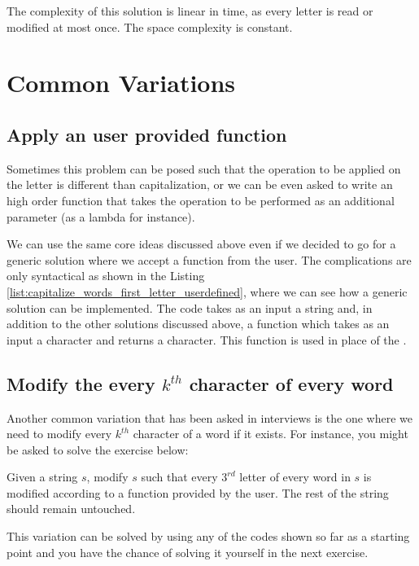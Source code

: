 The complexity of this solution is linear in time, as every letter is read or modified at most once. The space complexity is constant.



\section{Common Variations}
\label{capitalize_words_first_letter:sec:variation}

\subsection{Apply an user provided function}
Sometimes this problem can be posed such that the operation to be applied on the letter is different than capitalization, or we can be even asked to write an high order function that takes the operation to be performed as an additional parameter (as a lambda for instance).

We can use the same core ideas discussed above even if we decided to go for a generic solution where we accept a function from the user. The complications are only syntactical as shown in the Listing \ref{list:capitalize_words_first_letter_userdefined}, where we can see how a generic solution can be implemented.
The code takes as an input a string and, in addition to the other solutions discussed above, a function  which takes as an input a character and returns a character. This function is used in place of the .



\subsection{Modify the every $k^{th}$ character of every word}
Another common variation that has been asked in interviews is the one where we need to modify every $k^{th}$ character of a word if it exists. For instance, you might be asked to solve the exercise below:
\begin{exercise}
Given a string $s$, modify $s$ such that every $3^{rd}$ letter of every word in $s$ is modified according to a function provided by the user. The rest of the string should remain untouched.
\end{exercise}

This variation can be solved by using any of the codes shown so far as a starting point and you have the chance of solving it yourself in the next exercise.



